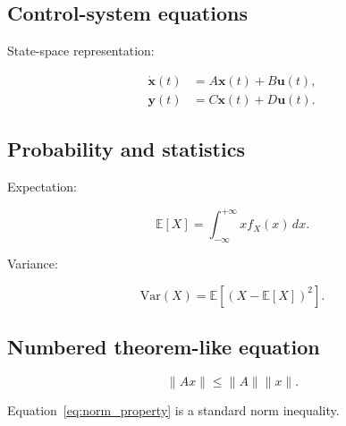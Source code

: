 \documentclass[10pt,a4paper]{scrartcl}
\begin{document}
  \subsection{Control-system equations}

  State-space representation:

  \begin{align}
      \dot{\bm{x}}(t)
          &=A\bm{x}(t)+B\bm{u}(t),\\
      \bm{y}(t)
          &=C\bm{x}(t)+D\bm{u}(t).
  \end{align}


  \subsection{Probability and statistics}

  Expectation:

  \begin{equation}
      \mathbb{E}[X]
      =
      \int_{-\infty}^{+\infty}
      x f_X(x)\,dx .
  \end{equation}


  Variance:

  \begin{equation}
      \mathrm{Var}(X)
      =
      \mathbb{E}
      \left[
          (X-\mathbb{E}[X])^2
      \right].
  \end{equation}


  \subsection{Numbered theorem-like equation}

  \begin{equation}
      \|Ax\|
      \leq
      \|A\|\|x\|.
      \label{eq:norm_property}
  \end{equation}

  Equation~\eqref{eq:norm_property} is a standard norm inequality.

  

  
\end{document}

